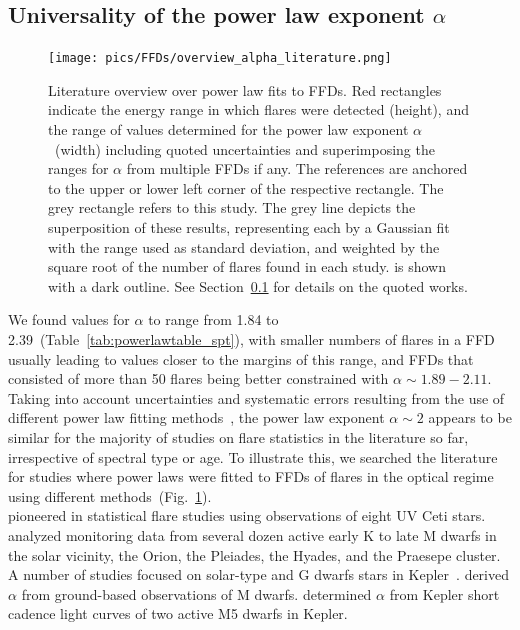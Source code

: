 \documentclass{aa}
\begin{document}
\subsection{Universality of the power law exponent $\alpha$}
\label{sec:sec:universal}
   \begin{figure}[t!]
   \centering
            \texttt{[image: pics/FFDs/overview\_alpha\_literature.png]}
         \caption{Literature overview over power law fits to FFDs. Red rectangles indicate the energy range in which flares were detected (height), and the range of values determined for the power law exponent $\alpha$~(width) including quoted uncertainties and superimposing the ranges for $\alpha$ from multiple FFDs if any. The references are anchored to the upper or lower left corner of the respective rectangle. The grey rectangle refers to this study. The grey line depicts the superposition of these results, representing each by a Gaussian fit with the range used as standard deviation, and weighted by the square root of the number of flares found in each study.  is shown with a dark outline. See Section~\ref{sec:sec:universal} for details on the quoted works.
}
          \label{fig:powerlaw_literature}
     
   \end{figure}
We found values for $\alpha$ to range from 1.84 to 2.39~(Table~\ref{tab:powerlawtable_spt}), with smaller numbers of flares in a FFD usually leading to values closer to the margins of this range, and FFDs that consisted of more than 50 flares being better constrained with $\alpha\sim 1.89-2.11$.
Taking into account uncertainties and systematic errors resulting from the use of different power law fitting methods~\citep{maschberger2009}, the power law exponent $\alpha\sim 2$ appears to be similar for the majority of studies on flare statistics in the literature so far, irrespective of spectral type or age. To illustrate this, we searched the literature for studies where power laws were fitted to FFDs of flares in the optical regime using different methods~(Fig.~\ref{fig:powerlaw_literature}). 
\\
 \citet{lacy_uv_1976} pioneered in statistical flare studies using observations of eight UV Ceti stars. \citet{shakhovskaya_stellar_1989} analyzed monitoring data from several dozen active early K to late M dwarfs in the solar vicinity, the Orion, the Pleiades, the Hyades, and the Praesepe cluster. A number of studies focused on solar-type and G dwarfs stars in Kepler~\citep{shibayama2013,wu2015}. \citet{hilton2011} derived $\alpha$ from ground-based observations of M dwarfs. \citet{lurie2015} determined $\alpha$ from Kepler short cadence light curves of two active M5 dwarfs in Kepler. %
\end{document}
